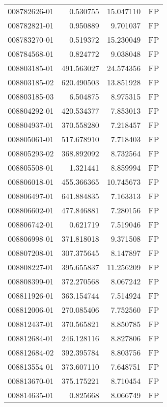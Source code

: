 \begin{tabular}{lrrl}
008782626-01 &    0.530755 &      15.047110 &   FP \\
008782821-01 &    0.950889 &       9.701037 &   FP \\
008783270-01 &    0.519372 &      15.230049 &   FP \\
008784568-01 &    0.824772 &       9.038048 &   FP \\
008803185-01 &  491.563027 &      24.574356 &   FP \\
008803185-02 &  620.490503 &      13.851928 &   FP \\
008803185-03 &    6.504875 &       8.975315 &   FP \\
008804292-01 &  420.534377 &       7.853013 &   FP \\
008804937-01 &  370.558280 &       7.218457 &   FP \\
008805061-01 &  517.678910 &       7.718403 &   FP \\
008805293-02 &  368.892092 &       8.732564 &   FP \\
008805508-01 &    1.321441 &       8.859994 &   FP \\
008806018-01 &  455.366365 &      10.745673 &   FP \\
008806497-01 &  641.884835 &       7.163313 &   FP \\
008806602-01 &  477.846881 &       7.280156 &   FP \\
008806742-01 &    0.621719 &       7.519046 &   FP \\
008806998-01 &  371.818018 &       9.371508 &   FP \\
008807208-01 &  307.375645 &       8.147897 &   FP \\
008808227-01 &  395.655837 &      11.256209 &   FP \\
008808399-01 &  372.270568 &       8.067242 &   FP \\
008811926-01 &  363.154744 &       7.514924 &   FP \\
008812006-01 &  270.085406 &       7.752560 &   FP \\
008812437-01 &  370.565821 &       8.850785 &   FP \\
008812684-01 &  246.128116 &       8.827806 &   FP \\
008812684-02 &  392.395784 &       8.803756 &   FP \\
008813554-01 &  373.607110 &       7.648751 &   FP \\
008813670-01 &  375.175221 &       8.710454 &   FP \\
008814635-01 &    0.825668 &       8.066749 &   FP \\

\end{tabular}
